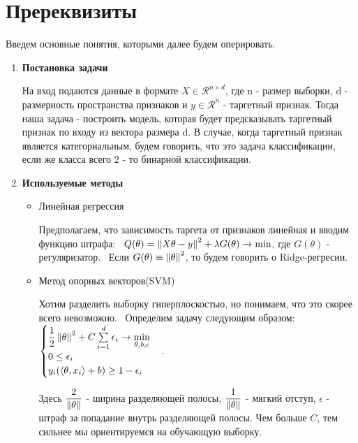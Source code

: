 
\section{Пререквизиты}
Введем основные понятия, которыми далее будем оперировать. \
\begin{enumerate}
  \item \textbf{Постановка задачи} \
  
        На вход подаются данные в формате $X \in \mathcal{R}^{n \times d}$, где n - размер выборки, d - размерность пространства признаков и $y \in \mathcal{R}^n$ - таргетный признак. 
        Тогда наша задача - построить модель, которая будет предсказывать таргетный признак по входу из вектора размера d. В случае, когда таргетный признак является категориальным, будем говорить, что это задача классификации, если же класса всего 2 - то бинарной классификации.
    \item \textbf{Используемые методы} \
        \begin{itemize}
            \item Линейная регрессия \
            
                Предполагаем, что зависимость таргета от признаков линейная и вводим функцию штрафа: \
                $Q(\theta) = \left\lVert X\theta - y\right\rVert^2 + \lambda G(\theta) \rightarrow \min$, где $G(\theta)$ - регуляризатор. \
                Если $G(\theta) \equiv \left\lVert\theta\right\rVert^2$, то будем говорить о Ridge-регресии.
                
            \item Метод опорных векторов(SVM) \
            
                Хотим разделить выборку гиперплоскостью, но понимаем, что это скорее всего невозможно. \ 
                Определим задачу следующим образом: \ 
                $\begin{cases} \dfrac{1}{2}\left\lVert\theta\right\rVert^2 + C \sum\limits_{i=1}^d \epsilon_i \rightarrow \min \limits_{\theta, b, \epsilon} \\ 0 \leq \epsilon_i \\ y_i(\langle \theta, x_i \rangle + b) \geq 1 - \epsilon_i \end{cases}$. \
                
                Здесь $\dfrac{2}{\left\lVert\theta\right\rVert}$ - ширина разделяющей полосы, $\dfrac{1}{\left\lVert\theta\right\rVert}$ - мягкий отступ, $\epsilon$ - штраф за попадание внутрь разделяющей полосы. Чем больше $C$, тем сильнее мы ориентируемся на обучающую выборку.
                

\end{itemize}
\end{enumerate}
